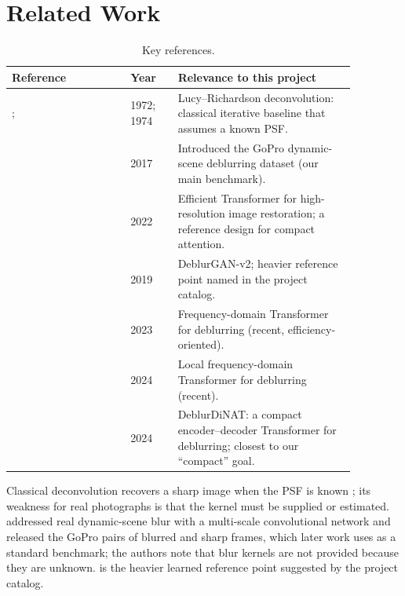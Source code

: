\documentclass[11pt]{article}
\begin{document}
\section{Related Work}
\label{sec:related}
\begin{table}[h]
\centering
\caption{Key references.}
\label{tab:refs}
\begin{tabular}{@{}p{0.30\linewidth}p{0.12\linewidth}p{0.45\linewidth}@{}}
\toprule
\textbf{Reference} & \textbf{Year} & \textbf{Relevance to this project} \\
\midrule
\citet{richardson1972}; \citet{lucy1974} & 1972; 1974 & Lucy--Richardson deconvolution: classical iterative baseline that assumes a known PSF. \\
\citet{nah2017} & 2017 & Introduced the GoPro dynamic-scene deblurring dataset (our main benchmark). \\
\citet{zamir2022} & 2022 & Efficient Transformer for high-resolution image restoration; a reference design for compact attention. \\
\citet{kupyn2019} & 2019 & DeblurGAN-v2; heavier reference point named in the project catalog. \\
\citet{kong2023} & 2023 & Frequency-domain Transformer for deblurring (recent, efficiency-oriented). \\
\citet{mao2024} & 2024 & Local frequency-domain Transformer for deblurring (recent). \\
\citet{liu2024} & 2024 & DeblurDiNAT: a compact encoder--decoder Transformer for deblurring; closest to our ``compact'' goal. \\
\bottomrule
\end{tabular}
\end{table}

Classical deconvolution recovers a sharp image when the PSF is known
\citep{richardson1972,lucy1974}; its weakness for real photographs is that the kernel
must be supplied or estimated. \citet{nah2017} addressed real dynamic-scene blur with a
multi-scale convolutional network and released the GoPro pairs of blurred and sharp
frames, which later work uses as a standard benchmark; the authors note that blur
kernels are not provided because they are unknown. \citet{kupyn2019} is the heavier
learned reference point suggested by the project catalog.
\end{document}
